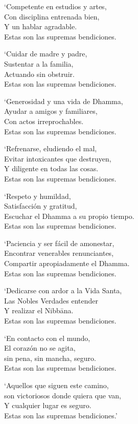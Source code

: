 \clearpage

`Competente en estudios y artes,\\
Con disciplina entrenada bien,\\
Y un hablar agradable.\\
Estas son las supremas bendiciones.

`Cuidar de madre y padre,\\
Sustentar a la familia,\\
Actuando sin obstruir.\\
Estas son las supremas bendiciones.

`Generosidad y una vida de Dhamma,\\
Ayudar a amigos y familiares,\\
Con actos irreprochables.\\
Estas son las supremas bendiciones.

`Refrenarse, eludiendo el mal,\\
Evitar intoxicantes que destruyen,\\
Y diligente en todas las cosas.\\
Estas son las supremas bendiciones.

`Respeto y humildad,\\
Satisfacción y gratitud,\\
Escuchar el Dhamma a su propio tiempo.\\
Estas son las supremas bendiciones.

`Paciencia y ser fácil de amonestar,\\
Encontrar venerables renunciantes,\\
Compartir apropiadamente el Dhamma.\\
Estas son las supremas bendiciones.

\clearpage

`Dedicarse con ardor a la Vida Santa,\\
Las Nobles Verdades entender\\
Y realizar el Nibbāna.\\
Estas son las supremas bendiciones.

`En contacto con el mundo,\\
El corazón no se agita,\\
sin pena, sin mancha, seguro.\\
Estas son las supremas bendiciones.

`Aquellos que siguen este camino,\\
son victoriosos donde quiera que van,\\
Y cualquier lugar es seguro.\\
Estas son las supremas bendiciones.'

